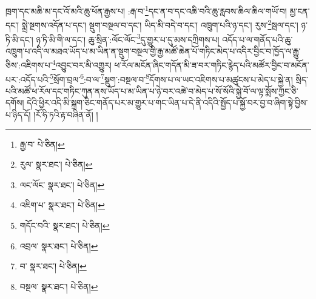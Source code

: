 ཁྲག་དང་མཆི་མ་དང་འོ་མའི་ཆུ་ཕོན་རྒྱས་པ། :རྒ་བ་\footnote{རྒྱ་བ་  པེ་ཅིན། }དང་ན་བ་དང་འཆི་བའི་ཆུ་རླབས་ཆིལ་ཆིལ་གཡོ་བ། མྱ་ངན་དང་། སྨྲེ་སྔགས་འདོན་པ་དང་། སྡུག་བསྔལ་བ་དང་། ཡིད་མི་བདེ་བ་དང་། འཁྲུག་པའི་ཉ་དང་། རུས་\footnote{རུལ་  སྣར་ཐང་།  པེ་ཅིན། }སྦལ་དང་། ཉ་ཏི་མི་དང་། ཉ་ཏི་མི་གི་ལ་དང་། ཆུ་སྲིན་:ལོང་ལོང་\footnote{ལང་ལོང་  སྣར་ཐང་།  པེ་ཅིན། }དུ་གྱུར་པ་དུ་མས་དཀྲིགས་པ། འདོད་པ་ལ་གནོད་པའི་ཆུ་འཁྲུག་པ་འདི་ལ་མཐའ་ཡོད་པ་མ་ཡིན་ན་སྡུག་བསྔལ་གྱི་རྒྱ་མཚོ་ཆེན་པོ་གཏིང་མེད་པ་འདིར་བྱིང་བ་ཁྱོད་ལ་རྒྱུ་ཅིས་:འཇིགས་པ་\footnote{འཇིག་པ་  སྣར་ཐང་།  པེ་ཅིན། }འབྱུང་བར་མི་འགྱུར། ཕ་རོལ་མངོན་ཞིང་གདོན་མི་ཟ་བར་གཏིང་རྙེད་པའི་མཚོར་བྱིང་བ་མངོན་པར་:འདོད་པའི་\footnote{གདོང་བའི་  སྣར་ཐང་།  པེ་ཅིན། }སྲོག་བྲལ་\footnote{འབྲལ་  སྣར་ཐང་།  པེ་ཅིན། }:བ་ལ་\footnote{བ་  སྣར་ཐང་།  པེ་ཅིན། }སྡུག་:བསྔལ་བ་\footnote{བསྔལ་  སྣར་ཐང་།  པེ་ཅིན། }དོགས་པ་ལ་ཡང་འཇིགས་པ་མཚུངས་པ་མེད་པ་སྐྱེ་ན། སྲིད་པའི་མཚོ་ཕ་རོལ་དང་གཏིང་ཀུན་ནས་ཡོད་པ་མ་ཡིན་པ་ཉེ་བར་འཚེ་བ་མེད་པ་སོ་སོའི་སྐྱེ་བོ་ལ་ལྟ་སྨོས་ཀྱང་ཅི་དགོས། དེའི་ཕྱིར་འདི་མི་སྐྲག་ཅིང་གནོད་པར་མ་གྱུར་པ་གང་ཡིན་པ་དེ་ནི་འདིའི་སྤྱོད་པ་སྐྱོ་བར་བྱ་བ་ཞིག་སྟེ་བྱིས་པ་ཉིད་དོ། །རོ་ཧི་ཏའི་རྟ་བཞིན་ནོ། །
